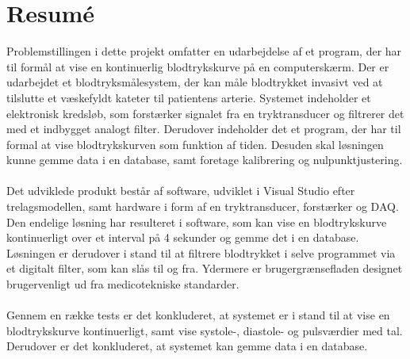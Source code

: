 \chapter{Resumé}
Problemstillingen i dette projekt omfatter en udarbejdelse af et program, der har til formål at vise en kontinuerlig blodtrykskurve på en computerskærm. Der er udarbejdet et blodtryksmålesystem, der kan måle blodtrykket invasivt ved at tilslutte et væskefyldt kateter til patientens arterie. Systemet indeholder et elektronisk kredsløb, som forstærker signalet fra en tryktransducer og filtrerer det med et indbygget analogt filter. Derudover indeholder det et program, der har til formal at vise blodtrykskurven som funktion af tiden. Desuden skal løsningen kunne gemme data i en database, samt foretage kalibrering og nulpunktjustering.\\\\
Det udviklede produkt består af software, udviklet i Visual Studio efter trelagsmodellen, samt hardware i form af en tryktransducer, forstærker og DAQ. 
Den endelige løsning har resulteret i software, som kan vise en blodtrykskurve kontinuerligt over et interval på 4 sekunder og gemme det i en database. Løsningen er derudover i stand til at filtrere blodtrykket i selve programmet via et digitalt filter, som kan slås til og fra. Ydermere er brugergrænsefladen designet brugervenligt ud fra medicotekniske standarder.\\\\
Gennem en række tests er det konkluderet, at systemet er i stand til at vise en blodtrykskurve kontinuerligt, samt vise systole-, diastole- og pulsværdier med tal. Derudover er det konkluderet, at systemet kan gemme data i en database.

